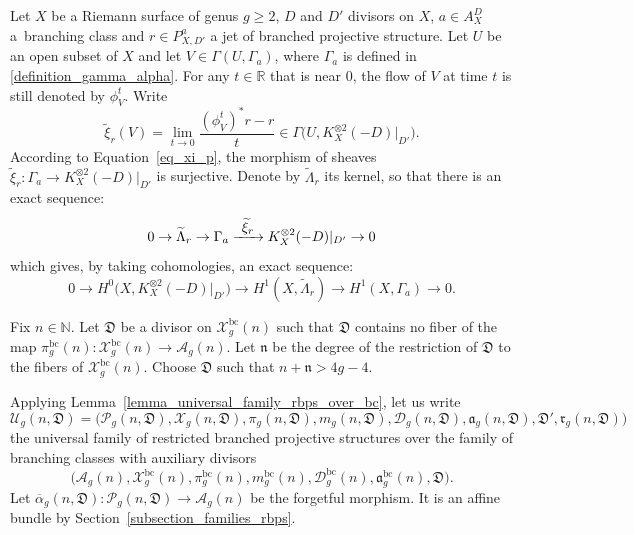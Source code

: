 \documentclass[JEP,XML,SOM,Unicode,NoEqCountersInSection,published]{cedram}
\newcommand\To[1]{\mathchoice{\xrightarrow{\textstyle\kern4pt#1\kern3pt}}{\stackrel{#1}{\longrightarrow}}{}{}}
\newcommand{\N}{\mathbb N}
\newcommand{\R}{\mathbb R}
\newcommand{\BC}{\mathrm{bc}}
\theoremstyle{definition}
\theoremstyle{plain}
\begin{document}
Let $X$ be a Riemann surface of genus $g \ge 2$, $D$ and $D'$ divisors on $X$, $a \in A_X^D$ a~branching class and $r \in P_{X, D'}^a$ a jet of branched projective structure.
Let $U$ be an open subset of $X$ and let $V \in\Gamma(U, \Gamma_a)$, where $\Gamma_a$ is defined in \eqref{definition_gamma_alpha}.
For any $t \in \R$ that is near $0$, the flow of $V$ at time $t$ is still denoted by $\phi^t_V$.
Write
\begin{equation*}
\widetilde \xi_r(V) = \lim_{t \to 0} \frac{(\phi^t_V)^*r - r}t \in \Gamma\bigl(U, K_X^{\otimes 2}(-D)|_{D'}\bigr).
\end{equation*}
According to Equation~\ref{eq_xi_p}, the morphism of sheaves $\widetilde \xi_r: \Gamma_a \to K_X^{\otimes 2}(-D)|_{D'}$ is surjective.
Denote by $\widetilde \Lambda_r$ its kernel, so that there is an exact sequence:
\begin{equation*}
0 \to \widetilde \Lambda_r \to \Gamma_a \To{\widetilde \xi_r} K_X^{\otimes 2}(-D)|_{D'} \to 0
\end{equation*}
which gives, by taking cohomologies, an exact sequence:
\begin{equation}\label{eq_exact_cohom_classes_jets}
0 \to H^0\bigl(X, K_X^{\otimes 2}(-D)|_{D'}\bigr) \to H^1(X, \widetilde \Lambda_r) \to H^1(X, \Gamma_a) \to 0.
\end{equation}

Fix $n \in \N$.
Let $\mathfrak D$ be a divisor on $\mathcal X_g^{\BC}(n)$ such that $\mathfrak D$ contains no fiber of the map $\pi_g^{\BC}(n): \mathcal X_g^{\BC}(n) \to \mathcal A_g(n)$.
Let $\mathfrak n$ be the degree of the restriction of $\mathfrak D$ to the fibers of $\mathcal X_g^{\BC}(n)$.
Choose $\mathfrak D$ such that $n + \mathfrak n > 4g-4$.

Applying Lemma~\ref{lemma_universal_family_rbps_over_bc}, let us write
\[
\mathcal U_g(n, \mathfrak D) = \bigl(\mathcal P_g(n, \mathfrak D), \mathcal X_g(n, \mathfrak D), \pi_g(n, \mathfrak D), m_g(n, \mathfrak D), \mathcal D_g(n, \mathfrak D), \mathfrak a_g(n, \mathfrak D), \mathfrak D', \mathfrak r_g(n, \mathfrak D)\bigr)
\]
the universal family of restricted branched projective structures over the family of branching classes with auxiliary divisors
\[
\bigl(\mathcal A_g(n), \mathcal X_g^{\BC}(n), \pi_g^{\BC}(n), m_g^{\BC}(n), \mathcal D_g^{\BC}(n), \mathfrak a_g^{\BC}(n), \mathfrak D\bigr).
\]
Let $\overline \alpha_g(n, \mathfrak D): \mathcal P_g(n, \mathfrak D) \to \mathcal A_g(n)$ be the forgetful morphism.
It is an affine bundle by Section~\ref{subsection_families_rbps}.
\end{document}
